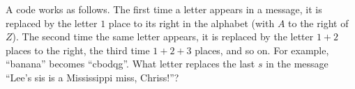 A code works as follows. The first time a letter appears in a message, it is replaced by the letter $1$ place to its right in the alphabet (with $A$ to the right of $Z$). The second time the same letter appears, it is replaced by the letter $1+2$ places to the right, the third time $1+2+3$ places, and so on. For example, ``banana'' becomes ``cbodqg''. What letter replaces the last $s$ in the message ``Lee's sis is a Mississippi miss, Chriss!''?
